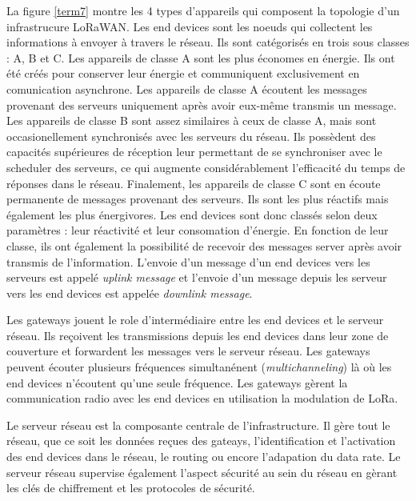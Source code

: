 La figure \ref{term7} montre les 4 types d'appareils qui composent la topologie d'un infrastrucure LoRaWAN.
Les end devices sont les noeuds qui collectent les informations à envoyer à travers le réseau. Ils sont catégorisés en trois sous classes : A, B et C. Les appareils de classe A sont les plus économes en énergie. Ils ont été créés pour conserver leur énergie et communiquent exclusivement en comunication asynchrone. Les appareils de classe A écoutent les messages provenant des serveurs uniquement après avoir eux-même transmis un message. Les appareils de classe B sont assez similaires à ceux de classe A, mais sont occasionellement synchronisés avec les serveurs du réseau. Ils possèdent des capacités supérieures de réception leur permettant de se synchroniser avec le scheduler des serveurs, ce qui augmente considérablement l'efficacité du temps de réponses dans le réseau. Finalement, les appareils de classe C sont en écoute permanente de messages provenant des serveurs. Ils sont les plus réactifs mais également les plus énergivores. Les end devices sont donc classés selon deux paramètres : leur réactivité et leur consomation d'énergie. En fonction de leur classe, ils ont également la possibilité de recevoir des messages server après avoir transmis de l'information. L'envoie d'un message d'un end devices vers les serveurs est appelé \textit{uplink message} et l'envoie d'un message depuis les serveur vers les end devices est appelée \textit{downlink message}.

\vspace{0.1cm}

Les gateways jouent le role d'intermédiaire entre les end devices et le serveur réseau. Ils reçoivent les transmissions depuis les end devices dans leur zone de couverture
et forwardent les messages vers le serveur réseau. Les gateways peuvent écouter plusieurs fréquences simultanénent (\textit{multichanneling}) là où les end devices n'écoutent qu'une seule fréquence. Les gateways gèrent la communication radio avec les end devices en utilisation la modulation de LoRa.

\vspace{0.1cm}

Le serveur réseau est la composante centrale de l'infrastructure. Il gère tout le réseau, que ce soit les données reçues des gateays, l'identification et l'activation des end devices dans le réseau, le routing ou encore l'adapation du data rate. Le serveur réseau supervise également l'aspect sécurité au sein du réseau en gèrant les clés de chiffrement et les protocoles de sécurité.

